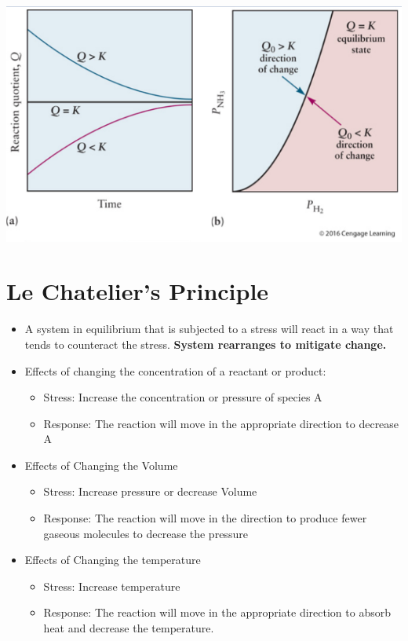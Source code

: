 \documentclass[10pt]{article}
\begin{document}
\begin{center}
    \includegraphics*[scale=0.8]{W6_3.png}
\end{center}

\section*{Le Chatelier's Principle}
\begin{itemize}
    \item A system in equilibrium that is subjected to a stress will react in a way that tends to counteract the stress.  \textbf{System rearranges to mitigate change.}
    \item Effects of changing the concentration of a reactant or product:
    \begin{itemize}
        \item Stress: Increase the concentration or pressure of species A
        \item Response: The reaction will move in the appropriate direction to decrease A
    \end{itemize}
    \item Effects of Changing the Volume
    \begin{itemize}
        \item Stress: Increase pressure or decrease Volume
        \item Response: The reaction will move in the direction to produce fewer gaseous molecules to decrease the pressure
    \end{itemize}
    \item Effects of Changing the temperature
    \begin{itemize}
        \item Stress: Increase temperature
        \item Response: The reaction will move in the appropriate direction to absorb heat and decrease the temperature.
    \end{itemize}
\end{itemize}
\end{document}
